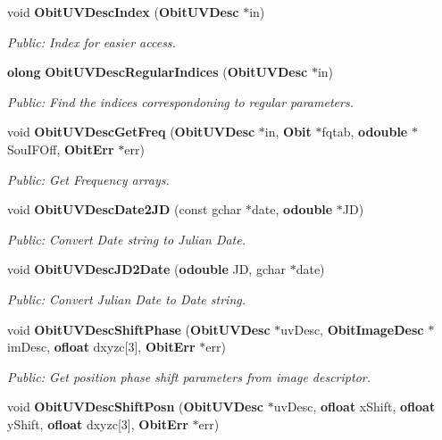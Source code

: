 \begin{CompactItemize}
void {\bf Obit\-UVDesc\-Index} ({\bf Obit\-UVDesc} $\ast$in)
\begin{CompactList}\small\item\em Public: Index for easier access. \item\end{CompactList}\item 
{\bf olong} {\bf Obit\-UVDesc\-Regular\-Indices} ({\bf Obit\-UVDesc} $\ast$in)
\begin{CompactList}\small\item\em Public: Find the indices correspondoning to regular parameters. \item\end{CompactList}\item 
void {\bf Obit\-UVDesc\-Get\-Freq} ({\bf Obit\-UVDesc} $\ast$in, {\bf Obit} $\ast$fqtab, {\bf odouble} $\ast$Sou\-IFOff, {\bf Obit\-Err} $\ast$err)
\begin{CompactList}\small\item\em Public: Get Frequency arrays. \item\end{CompactList}\item 
void {\bf Obit\-UVDesc\-Date2JD} (const gchar $\ast$date, {\bf odouble} $\ast$JD)
\begin{CompactList}\small\item\em Public: Convert Date string to Julian Date. \item\end{CompactList}\item 
void {\bf Obit\-UVDesc\-JD2Date} ({\bf odouble} JD, gchar $\ast$date)
\begin{CompactList}\small\item\em Public: Convert Julian Date to Date string. \item\end{CompactList}\item 
void {\bf Obit\-UVDesc\-Shift\-Phase} ({\bf Obit\-UVDesc} $\ast$uv\-Desc, {\bf Obit\-Image\-Desc} $\ast$im\-Desc, {\bf ofloat} dxyzc[3], {\bf Obit\-Err} $\ast$err)
\begin{CompactList}\small\item\em Public: Get position phase shift parameters from image descriptor. \item\end{CompactList}\item 
void {\bf Obit\-UVDesc\-Shift\-Posn} ({\bf Obit\-UVDesc} $\ast$uv\-Desc, {\bf ofloat} x\-Shift, {\bf ofloat} y\-Shift, {\bf ofloat} dxyzc[3], {\bf Obit\-Err} $\ast$err)

\end{CompactItemize}
